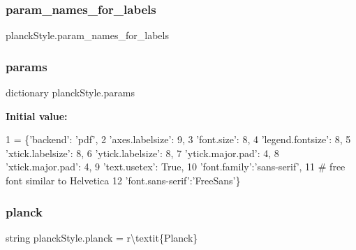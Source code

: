 \subsubsection{\texorpdfstring{param\+\_\+names\+\_\+for\+\_\+labels}{param\_names\_for\_labels}}
{\footnotesize\ttfamily planck\+Style.\+param\+\_\+names\+\_\+for\+\_\+labels}

\mbox{\label{namespaceplanckStyle_a1666da6ae091dd32e1a56e606247632e}} 
\subsubsection{\texorpdfstring{params}{params}}
{\footnotesize\ttfamily dictionary planck\+Style.\+params}

{\bfseries Initial value\+:}
\begin{DoxyCode}
1 =  \{\textcolor{stringliteral}{'backend'}: \textcolor{stringliteral}{'pdf'},
2           \textcolor{stringliteral}{'axes.labelsize'}: 9,
3           \textcolor{stringliteral}{'font.size'}: 8,
4           \textcolor{stringliteral}{'legend.fontsize'}: 8,
5           \textcolor{stringliteral}{'xtick.labelsize'}: 8,
6           \textcolor{stringliteral}{'ytick.labelsize'}: 8,
7           \textcolor{stringliteral}{'ytick.major.pad'}: 4,
8           \textcolor{stringliteral}{'xtick.major.pad'}: 4,
9           \textcolor{stringliteral}{'text.usetex'}: \textcolor{keyword}{True},
10           \textcolor{stringliteral}{'font.family'}:\textcolor{stringliteral}{'sans-serif'},
11           \textcolor{comment}{# free font similar to Helvetica}
12           \textcolor{stringliteral}{'font.sans-serif'}:\textcolor{stringliteral}{'FreeSans'}\}
\end{DoxyCode}
\mbox{\label{namespaceplanckStyle_a2c1fad2ca24935c30ce6a18cda04923d}} 
\subsubsection{\texorpdfstring{planck}{planck}}
{\footnotesize\ttfamily string planck\+Style.\+planck = r\textquotesingle{}\textbackslash{}textit\{Planck\}\textquotesingle{}}

\mbox{\label{namespaceplanckStyle_a24b867c323ad9dcba5797d30db29c86a}} 
